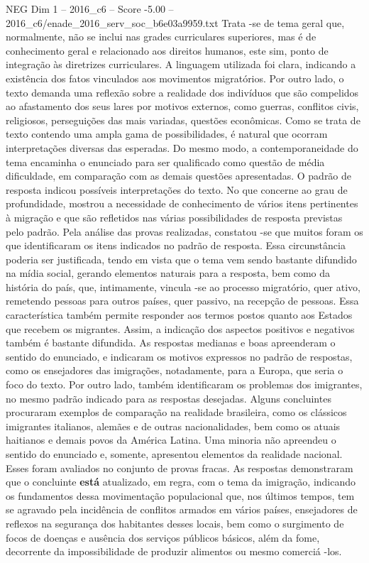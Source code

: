\begin{textsample}{NEG Dim 1 – 2016\_c6 – Score -5.00 – 2016\_c6/enade\_2016\_serv\_soc\_b6e03a9959.txt}
Trata -se de tema geral que, normalmente, não se inclui nas grades curriculares superiores, mas é de conhecimento geral e relacionado aos direitos humanos, este sim, ponto de integração às diretrizes curriculares.
A linguagem utilizada foi clara, indicando a existência dos fatos vinculados aos movimentos migratórios.
Por outro lado, o texto demanda uma reflexão sobre a realidade dos indivíduos que são compelidos ao afastamento dos seus lares por motivos externos, como guerras, conflitos civis, religiosos, perseguições das mais variadas, questões econômicas.
Como se trata de texto contendo uma ampla gama de possibilidades, é natural que ocorram interpretações diversas das esperadas.
Do mesmo modo, a contemporaneidade do tema encaminha o enunciado para ser qualificado como questão de média dificuldade, em comparação com as demais questões apresentadas.
O padrão de resposta indicou possíveis interpretações do texto.
No que concerne ao grau de profundidade, mostrou a necessidade de conhecimento de vários itens pertinentes à migração e que são refletidos nas várias possibilidades de resposta previstas pelo padrão.
Pela análise das provas realizadas, constatou -se que muitos foram os que identificaram os itens indicados no padrão de resposta.
Essa circunstância poderia ser justificada, tendo em vista que o tema vem sendo bastante difundido na mídia social, gerando elementos naturais para a resposta, bem como da história do país, que, intimamente, vincula -se ao processo migratório, quer ativo, remetendo pessoas para outros países, quer passivo, na recepção de pessoas.
Essa característica também permite responder aos termos postos quanto aos Estados que recebem os migrantes.
Assim, a indicação dos aspectos positivos e negativos também é bastante difundida.
As respostas medianas e boas apreenderam o sentido do enunciado, e indicaram os motivos expressos no padrão de respostas, como os ensejadores das imigrações, notadamente, para a Europa, que seria o foco do texto.
Por outro lado, também identificaram os problemas dos imigrantes, no mesmo padrão indicado para as respostas desejadas.
Alguns concluintes procuraram exemplos de comparação na realidade brasileira, como os clássicos imigrantes italianos, alemães e de outras nacionalidades, bem como os atuais haitianos e demais povos da América Latina.
Uma minoria não apreendeu o sentido do enunciado e, somente, apresentou elementos da realidade nacional.
Esses foram avaliados no conjunto de provas fracas.
As respostas demonstraram que o concluinte \textbf{está} atualizado, em regra, com o tema da imigração, indicando os fundamentos dessa movimentação populacional que, nos últimos tempos, tem se agravado pela incidência de conflitos armados em vários países, ensejadores de reflexos na segurança dos habitantes desses locais, bem como o surgimento de focos de doenças e ausência dos serviços públicos básicos, além da fome, decorrente da impossibilidade de produzir alimentos ou mesmo comerciá -los.

\end{textsample}
